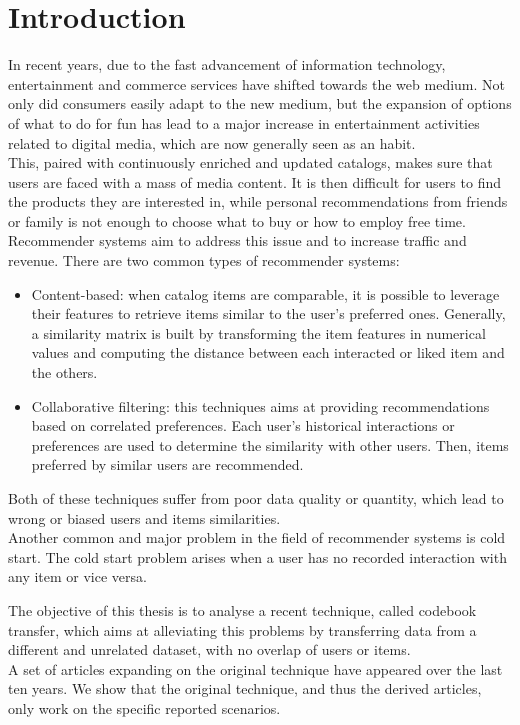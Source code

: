 \chapter{Introduction}

In recent years, due to the fast advancement of information technology, entertainment and commerce services have shifted towards the web medium.
Not only did consumers easily adapt to the new medium, but the expansion of options of what to do for fun has lead to a major increase in entertainment activities related to digital media, which are now generally seen as an habit.\\
This, paired with continuously enriched and updated catalogs, makes sure that users are faced with a mass of media content. It is then difficult for users to find the products they are interested in, while personal recommendations from friends or family is not enough to choose what to buy or how to employ free time. Recommender systems aim to address this issue and to increase traffic and revenue. There are two common types of recommender systems:
\begin{itemize}
\item Content-based: when catalog items are comparable, it is possible to leverage their features to retrieve items similar to the user's preferred ones. Generally, a similarity matrix is built by transforming the item features in numerical values and computing the distance between each interacted or liked item and the others.
\item Collaborative filtering: this techniques aims at providing recommendations based on correlated preferences. Each user's historical interactions or preferences are used to determine the similarity with other users. Then, items preferred by similar users are recommended.
\end{itemize}
Both of these techniques suffer from poor data quality or quantity, which lead to wrong or biased users and items similarities.\\
Another common and major problem in the field of recommender systems is cold start.
The cold start problem arises when a user has no recorded interaction with any item or vice versa.\par
The objective of this thesis is to analyse a recent technique, called codebook transfer, which aims at alleviating this problems by transferring data from a different and unrelated dataset, with no overlap of users or items.\\
A set of articles expanding on the original technique have appeared over the last ten years.
We show that the original technique, and thus the derived articles, only work on the specific reported scenarios.

